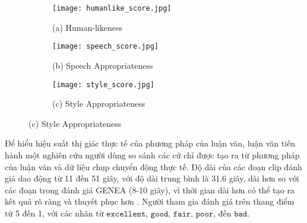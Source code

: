 \begin{figure}[htbp]
	\centering
	\begin{subfigure}[b]{0.3\textwidth}
		\texttt{[image: humanlike\_score.jpg]}
		\caption*{(a) Human-likeness}
	\end{subfigure}
	\hfill
	\begin{subfigure}[b]{0.3\textwidth}
		\texttt{[image: speech\_score.jpg]}
		\caption*{\small (b) Speech Appropriateness}
	\end{subfigure}
	\hfill
	\begin{subfigure}[b]{0.3\textwidth}
		\texttt{[image: style\_score.jpg]}
		\caption*{(c) Style Appropriateness}
	\end{subfigure}
	
	\label{fig:compare }
\end{figure}


Để hiểu hiệu suất thị giác thực tế của phương pháp của luận văn, luận văn tiến hành một nghiên cứu người dùng so sánh các cử chỉ được tạo ra từ phương pháp của luận văn và dữ liệu chụp chuyển động thực tế. Độ dài của các đoạn clip đánh giá dao động từ 11 đến 51 giây, với độ dài trung bình là 31.6 giây, dài hơn so với các đoạn trong đánh giá GENEA \cite{yoon2022genea} (8-10 giây), vì thời gian dài hơn có thể tạo ra kết quả rõ ràng và thuyết phục hơn \cite{yang2022reprgesture}. Người tham gia đánh giá trên thang điểm từ 5 đến 1, với các nhãn từ $\texttt{excellent}$,  $\texttt{good}$, $\texttt{fair}$, $\texttt{poor}$, đến $\texttt{bad}$. 


